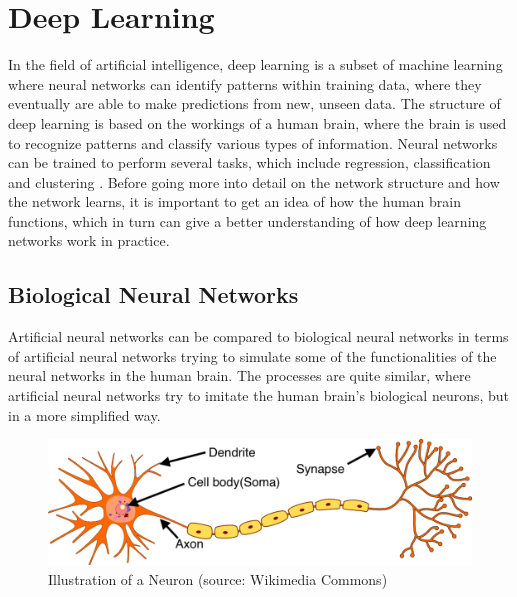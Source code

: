 \section{Deep Learning}
In the field of artificial intelligence, deep learning is a subset of machine learning where neural networks can identify patterns within training data, where they eventually are able to make predictions from new, unseen data. The structure of deep learning is based on the workings of a human brain, where the brain is used to recognize patterns and classify various types of information. Neural networks can be trained to perform several tasks, which include regression, classification and clustering \cite{opper}. Before going more into detail on the network structure and how the network learns, it is important to get an idea of how the human brain functions, which in turn can give a better understanding of how deep learning networks work in practice.

\subsection{Biological Neural Networks}
Artificial neural networks can be compared to biological neural networks in terms of artificial neural networks trying to simulate some of the functionalities of the neural networks in the human brain. The processes are quite similar, where artificial neural networks try to imitate the human brain's biological neurons, but in a more simplified way.  

\indent\newline
\begin{figure}[H]
\centering
\includegraphics [scale=0.34,angle=360]{figures/bio.png}
\caption{Illustration of a Neuron (source: Wikimedia Commons)}
\label{fig:bio}
\end{figure}
 

